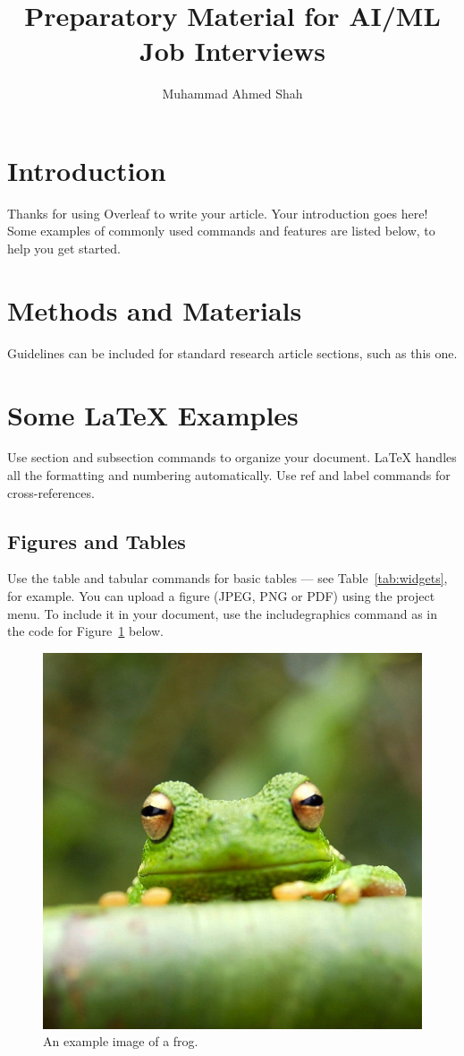 \documentclass[fleqn,10pt]{olplainarticle}
\title{Preparatory Material for AI/ML Job Interviews}
\author[1]{Muhammad Ahmed Shah}
\affil[1]{Language Technologies Institute, Carnegie Mellon University}
\begin{document}
\flushbottom
\maketitle
\thispagestyle{empty}

\section{Introduction}

Thanks for using Overleaf to write your article. Your introduction goes here! Some examples of commonly used commands and features are listed below, to help you get started.

\section*{Methods and Materials}

Guidelines can be included for standard research article sections, such as this one.

\section*{Some \LaTeX{} Examples}
\label{sec:examples}

Use section and subsection commands to organize your document. \LaTeX{} handles all the formatting and numbering automatically. Use ref and label commands for cross-references.

\subsection*{Figures and Tables}

Use the table and tabular commands for basic tables --- see Table~\ref{tab:widgets}, for example. You can upload a figure (JPEG, PNG or PDF) using the project menu. To include it in your document, use the includegraphics command as in the code for Figure~\ref{fig:view} below.

\begin{figure}[ht]
\centering
\includegraphics[width=0.7\linewidth]{frog}
\caption{An example image of a frog.}
\label{fig:view}
\end{figure}
\end{document}
